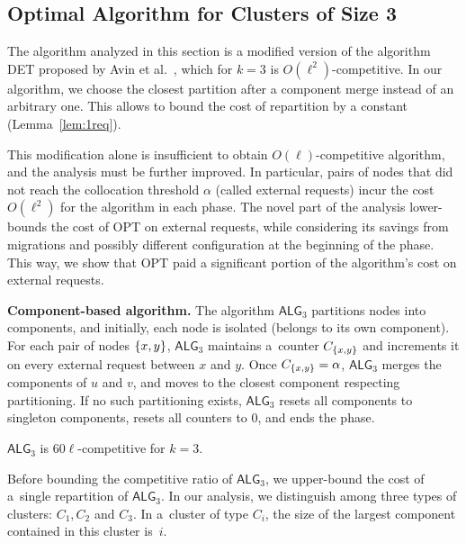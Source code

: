 \documentclass[a4paper,anonymous,USenglish]{lipics-v2019}
\newcommand{\OPT}{\textsc{OPT}\xspace}
\newcommand{\TAlg}{{\ensuremath{\textsf{ALG}_{3}}}\xspace}
\DeclarePairedDelimiter\set{\{}{\}}
\begin{document}
\subsection{Optimal Algorithm for Clusters of Size 3}
\label{sec:k3}

The algorithm analyzed in this section is a modified version of the algorithm DET proposed by Avin et al.~\cite{repartition-disc}, which for $k=3$ is $O(\ell^2)$-competitive.
In our algorithm, we choose the closest partition after a component merge instead of an arbitrary one.
This allows to bound the cost of repartition by a constant (Lemma~\ref{lem:1req}).

This modification alone is insufficient to obtain $O(\ell)$-competitive algorithm, and the analysis must be further improved.
In particular, pairs of nodes that did not reach the collocation threshold $\alpha$ (called external requests) incur the cost $O(\ell^2)$ for the algorithm in each phase.
The novel part of the analysis lower-bounds the cost of \OPT on external requests, while considering its savings from migrations and possibly different configuration at the beginning of the phase.
This way, we show that \OPT paid a significant portion of the algorithm's cost on external requests.

\medskip

\noindent
\textbf{Component-based algorithm.}
The algorithm \TAlg partitions nodes into components, and
initially, each node is isolated (belongs to its own component).
For each pair of nodes $\set{x,y}$, \TAlg maintains a~counter $C_{\set{x,y}}$ and increments it on every external request between $x$ and $y$.
Once $C_{\set{x,y}} = \alpha$, \TAlg merges the components of $u$ and $v$, and moves to the closest component respecting partitioning.
If no such partitioning exists, \TAlg resets all components to singleton components, resets all counters to $0$, and ends the phase.


\begin{theorem}
	\TAlg is $60\ell$-competitive for $k=3$.
	\label{thm:k=3}
\end{theorem}



Before bounding the competitive ratio of \TAlg, we upper-bound the cost of a~single repartition of \TAlg.
In our analysis, we distinguish among three types of clusters: $C_1, C_2$ and $C_3$. In a~cluster of type $C_i$, the size of the largest component contained in this cluster is~$i$.
\end{document}
